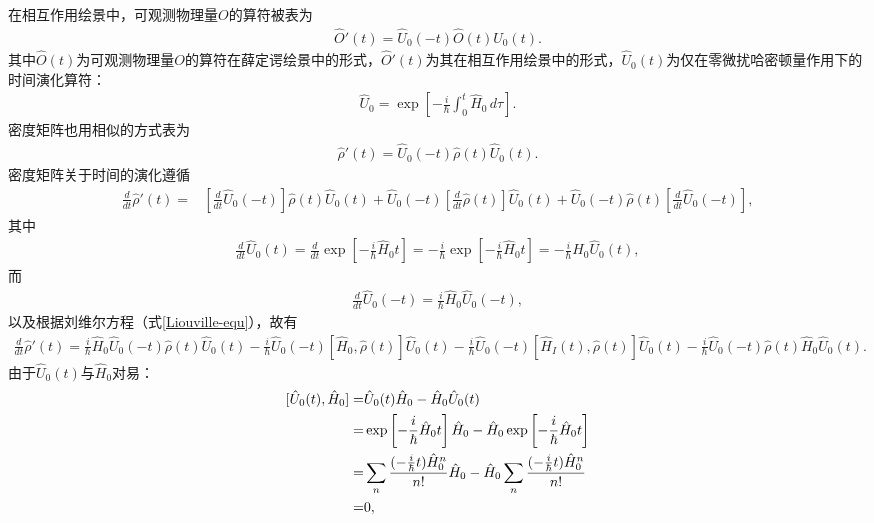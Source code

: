 \documentclass{assignment}
\begin{document}
在相互作用绘景中，可观测物理量$O$的算符被表为
\begin{align}
    \hat{O}'(t)=\hat{U}_0(-t)\hat{O}(t)\hat{U}_0(t).
\end{align}
其中$\hat{O}(t)$为可观测物理量$O$的算符在薛定谔绘景中的形式，$\hat{O}'(t)$为其在相互作用绘景中的形式，$\hat{U}_0(t)$为仅在零微扰哈密顿量作用下的时间演化算符：
\begin{align}
    \hat{U}_0=\exp\left[-\frac{i}{\hbar}\int_0^t\hat{H}_0\,d\tau\right].
\end{align}
密度矩阵也用相似的方式表为
\begin{align}
    \hat{\rho}'(t)=\hat{U}_0(-t)\hat{\rho}(t)\hat{U}_0(t).
\end{align}
密度矩阵关于时间的演化遵循
\begin{align}
    \frac{d}{dt}\hat{\rho}'(t)=&\left[\frac{d}{dt}\hat{U}_0(-t)\right]\hat{\rho}(t)\hat{U}_0(t)+\hat{U}_0(-t)\left[\frac{d}{dt}\hat{\rho}(t)\right]\hat{U}_0(t)+\hat{U}_0(-t)\hat{\rho}(t)\left[\frac{d}{dt}\hat{U}_0(-t)\right],
\end{align}
其中
\begin{align}
    \frac{d}{dt}\hat{U}_0(t)=\frac{d}{dt}\exp\left[-\frac{i}{\hbar}\hat{H}_0t\right]=-\frac{i}{\hbar}\exp\left[-\frac{i}{\hbar}\hat{H}_0t\right]=-\frac{i}{\hbar}\hat{H}_0\hat{U}_0(t),
\end{align}
而
\begin{align}
    \frac{d}{dt}\hat{U}_0(-t)=\frac{i}{\hbar}\hat{H}_0\hat{U}_0(-t),
\end{align}
以及根据刘维尔方程（式\eqref{Liouville-equ}），故有
\begin{align}
    \label{density-matrix-evolution-2}
    \frac{d}{dt}\hat{\rho}'(t)=\frac{i}{\hbar}\hat{H}_0\hat{U}_0(-t)\hat{\rho}(t)\hat{U}_0(t)-\frac{i}{\hbar}\hat{U}_0(-t)[\hat{H}_0,\hat{\rho}(t)]\hat{U}_0(t)-\frac{i}{\hbar}\hat{U}_0(-t)[\hat{H}_I(t),\hat{\rho}(t)]\hat{U}_0(t)-\frac{i}{\hbar}\hat{U}_0(-t)\hat{\rho}(t)\hat{H}_0\hat{U}_0(t).
\end{align}
由于$\hat{U}_0(t)$与$\hat{H}_0$对易：
\begin{align}
    \notag[\hat{U}_0(t),\hat{H}_0]=&\hat{U}_0(t)\hat{H}_0-\hat{H}_0\hat{U}_0(t)\\
    \notag=&\exp\left[-\frac{i}{\hbar}\hat{H}_0t\right]\hat{H}_0-\hat{H}_0\exp\left[-\frac{i}{\hbar}\hat{H}_0t\right]\\
    \notag=&\sum_n\frac{(-\frac{i}{\hbar}t)\hat{H}_0^n}{n!}\hat{H}_0-\hat{H}_0\sum_n\frac{(-\frac{i}{\hbar}t)\hat{H}_0^n}{n!}\\
    =&0,
\end{align}
\end{document}
